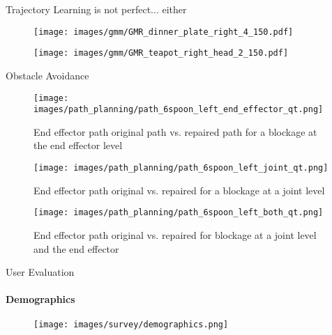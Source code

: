 \documentclass[aspectratio=169]{beamer}
\begin{document}
\begin{frame}{Trajectory Learning is not perfect... either}	
	\begin{minipage}{0.49\linewidth}
		\centering	
		\begin{figure}[h!]
			\texttt{[image: images/gmm/GMR\_dinner\_plate\_right\_4\_150.pdf]}
		\end{figure}
	\end{minipage}		
	\begin{minipage}{0.49\linewidth}
		\centering	
		\begin{figure}[h!]
			\texttt{[image: images/gmm/GMR\_teapot\_right\_head\_2\_150.pdf]}
		\end{figure}	
	\end{minipage}	
\end{frame}

\begin{frame}{Obstacle Avoidance}
	\begin{minipage}{0.33\linewidth}
		\centering	
		\begin{figure}[h!]
			\texttt{[image: images/path\_planning/path\_6spoon\_left\_end\_effector\_qt.png]}
			\caption{End effector path original path vs. repaired path for a blockage at the end effector level}
		\end{figure}
	\end{minipage}		
	\begin{minipage}{0.32\linewidth}
		\centering	
		\begin{figure}[h!]
			\texttt{[image: images/path\_planning/path\_6spoon\_left\_joint\_qt.png]}
			\caption{End effector path original vs. repaired for a blockage at a joint level}
		\end{figure}
	\end{minipage}	
	\begin{minipage}{0.33\linewidth}	
		\begin{figure}[h!]
			\texttt{[image: images/path\_planning/path\_6spoon\_left\_both\_qt.png]}
			\caption{End effector path original vs. repaired for blockage at a joint level and the end effector}
		\end{figure}
	\end{minipage}
\end{frame}

\begin{frame}{User Evaluation}
	\framesubtitle{Demographics}
		\vspace{-0.2cm}
		\begin{figure}[h!]
		\centering
		\texttt{[image: images/survey/demographics.png]}
	\end{figure}
\end{frame}
\end{document}
